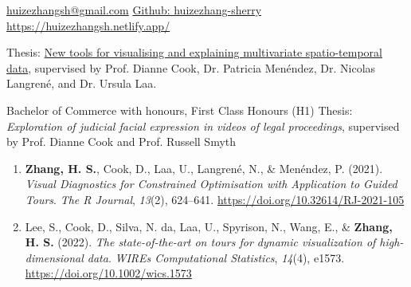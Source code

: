 \documentclass[10pt,a4paper]{article} %
\begin{document}
 


\begin{CJK}{UTF8}{gbsn}
\end{CJK}
\spacedhrule{0.9em}{-0.4em} %

\vspace{0.25cm}
\noindent
\href{mailto:huizezhangsh@gmail.com}{huizezhangsh@gmail.com}
\hspace{4em}
\href{https://github.com/huizezhang-sherry/}{Github: huizezhang-sherry}
\hfill
\href{https://huizezhangsh.netlify.app/}{https://huizezhangsh.netlify.app/}
\hfill

    {Thesis: \href{sherryzhang-thesis.netlify.app}{New tools for visualising and explaining multivariate spatio-temporal data},
    supervised by Prof. Dianne Cook, Dr. Patricia Men\'endez, Dr. Nicolas Langren\'e, and Dr. Ursula Laa. 
    }

    {Bachelor of Commerce with honours, First Class Honours (H1) \newline
    Thesis: \textit{Exploration of judicial facial expression in videos of legal proceedings}, supervised by Prof. Dianne Cook and Prof. Russell Smyth
    }

\vspace{-1em}
\begin{enumerate}[itemsep=0.1em]
    \item \textbf{Zhang, H. S.}, Cook, D., Laa, U., Langren\'e, N., \& Men\'endez, P. (2021). 
    \textit{Visual Diagnostics for Constrained Optimisation with Application to Guided Tours}. 
    \emph{The R Journal}, \emph{13}(2), 624--641. \url{https://doi.org/10.32614/RJ-2021-105}
    
    \item Lee, S., Cook, D., Silva, N. da, Laa, U., Spyrison, N., Wang, E., \& \textbf{Zhang, H. S.} (2022). 
    \textit{The state-of-the-art on tours for dynamic visualization of high-dimensional data}. 
    \emph{WIREs Computational Statistics}, \emph{14}(4), e1573. \url{https://doi.org/10.1002/wics.1573}
\end{enumerate}
\end{document}
